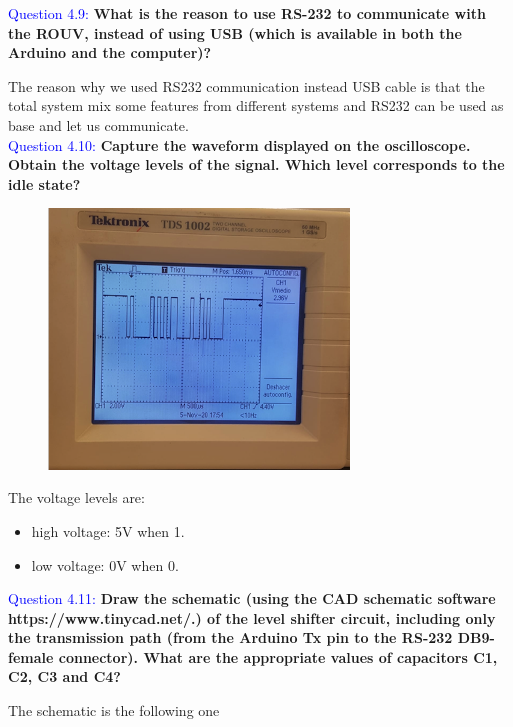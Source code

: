 \documentclass[12pt, a4papre]{article}
\begin{document}
	\textcolor{blue}{Question 4.9:} \textbf{What is the reason to use RS-232 to communicate with the ROUV, instead of using USB (which is available in both the Arduino and the computer)?}
	
	The reason why we used RS232 communication instead USB cable is that the total system mix some features from different systems and RS232 can be used as base and let us communicate.\\

	\textcolor{blue}{Question 4.10:} \textbf{Capture the waveform displayed on the oscilloscope. Obtain the voltage levels of the signal. Which level corresponds to the idle state?}
	
	\begin{figure}[H]
		\begin{center}
		\includegraphics[width=80mm]{LletraA_Arduino.png}
		\end{center}
	\end{figure}
	The voltage levels are: 
	\begin{itemize}
		\item high voltage: 5V when 1.
		\item low voltage: 0V when 0.
	\end{itemize}
	
	
	\textcolor{blue}{Question 4.11:} \textbf{Draw the schematic (using the CAD schematic software https://www.tinycad.net/.) of the level shifter circuit, including only the transmission path (from the Arduino Tx pin to the RS-232 DB9-female connector). What are the appropriate values of capacitors C1, C2, C3 and C4?}
	
	The schematic is the following one
	
\end{document}
